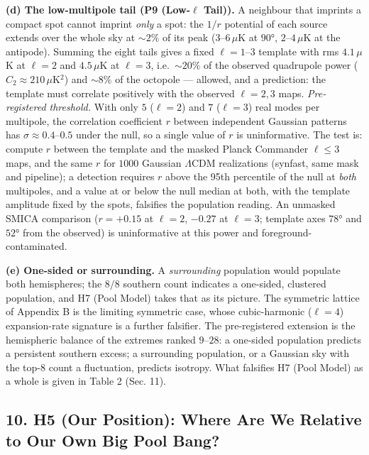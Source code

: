\documentclass[
]{article}
\begin{document}
\textbf{(d) The low-multipole tail (P9 (Low-\(\ell\) Tail)).} A
neighbour that imprints a compact spot cannot imprint \emph{only} a
spot: the \(1/r\) potential of each source extends over the whole sky at
\(\sim\!2\%\) of its peak (\(3\)--\(6\,\mu\)K at \(90°\),
\(2\)--\(4\,\mu\)K at the antipode). Summing the eight tails gives a
fixed \(\ell = 1\)--\(3\) template with rms \(4.1\,\mu\)K at \(\ell=2\)
and \(4.5\,\mu\)K at \(\ell=3\), i.e.~\(\sim\!20\%\) of the observed
quadrupole power (\(C_2 \approx 210\,\mu\)K\(^2\)) and \(\sim\!8\%\) of
the octopole --- allowed, and a prediction: the template must correlate
positively with the observed \(\ell = 2, 3\) maps. \emph{Pre-registered
threshold.} With only \(5\) (\(\ell=2\)) and \(7\) (\(\ell=3\)) real
modes per multipole, the correlation coefficient \(r\) between
independent Gaussian patterns has \(\sigma \approx 0.4\)--\(0.5\) under
the null, so a single value of \(r\) is uninformative. The test is:
compute \(r\) between the template and the masked Planck Commander
\(\ell \le 3\) maps, and the same \(r\) for \(1000\) Gaussian
\(\Lambda\)CDM realizations (synfast, same mask and pipeline); a
detection requires \(r\) above the 95th percentile of the null at
\emph{both} multipoles, and a value at or below the null median at both,
with the template amplitude fixed by the spots, falsifies the population
reading. An unmasked SMICA comparison (\(r = +0.15\) at \(\ell=2\),
\(-0.27\) at \(\ell=3\); template axes \(78°\) and \(52°\) from the
observed) is uninformative at this power and foreground-contaminated.

\textbf{(e) One-sided or surrounding.} A \emph{surrounding} population
would populate both hemispheres; the \(8/8\) southern count indicates a
one-sided, clustered population, and H7 (Pool Model) takes that as its
picture. The symmetric lattice of Appendix B is the limiting symmetric
case, whose cubic-harmonic (\(\ell = 4\)) expansion-rate signature is a
further falsifier. The pre-registered extension is the hemispheric
balance of the extremes ranked \(9\)--\(28\): a one-sided population
predicts a persistent southern excess; a surrounding population, or a
Gaussian sky with the top-8 count a fluctuation, predicts isotropy. What
falsifies H7 (Pool Model) as a whole is given in Table 2 (Sec. 11).

\hypertarget{h5-our-position-where-are-we-relative-to-our-own-big-pool-bang}{%
\subsection{\texorpdfstring{\textbf{10. H5 (Our Position): Where Are We
Relative to Our Own Big Pool
Bang?}}{10. H5 (Our Position): Where Are We Relative to Our Own Big Pool Bang?}}\label{h5-our-position-where-are-we-relative-to-our-own-big-pool-bang}}
\end{document}
